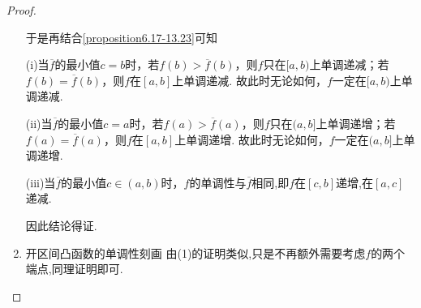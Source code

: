\documentclass[lang=cn,newtx,10pt,scheme=chinese]{elegantbook}
\begin{document}
\begin{proof}
\begin{enumerate}
于是再结合\eqref{proposition6.17-13.23}可知

(i)当\(\overline{f}\)的最小值\(c = b\)时，若\(f(b)>\overline{f}(b)\)，则\(f\)只在\([a,b)\)上单调递减；若\(f(b)=\overline{f}(b)\)，则\(f\)在\([a,b]\)上单调递减. 故此时无论如何，\(f\)一定在\([a,b)\)上单调递减.

(ii)当\(\overline{f}\)的最小值\(c = a\)时，若\(f(a)>\overline{f}(a)\)，则\(f\)只在\((a,b]\)上单调递增；若\(f(a)=\overline{f}(a)\)，则\(f\)在\([a,b]\)上单调递增. 故此时无论如何，\(f\)一定在\((a,b]\)上单调递增.

(iii)当\(\overline{f}\)的最小值\(c\in(a,b)\)时，\(f\)的单调性与\(\overline{f}\)相同,即\(f\)在\([c,b]\)递增,在\([a,c]\)递减.

因此结论得证.

\item {\heiti 开区间凸函数的单调性刻画}
由(1)的证明类似,只是不再额外需要考虑$f$的两个端点,同理证明即可.
\end{enumerate}
\end{proof}
\end{document}
